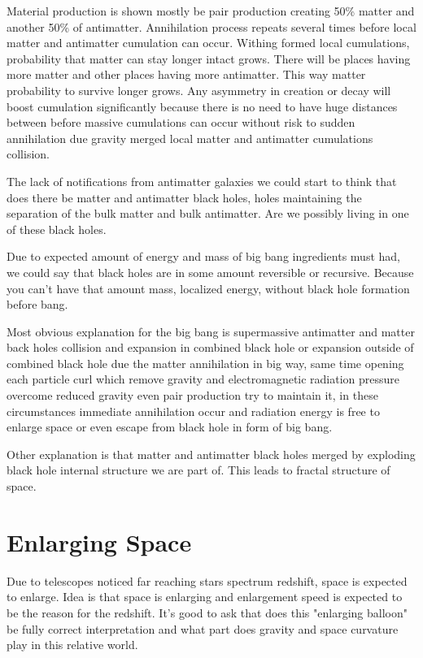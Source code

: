 Material production is shown mostly be pair production creating 50\% matter
and another 50\% of antimatter. Annihilation process repeats several times
before local matter and antimatter cumulation can occur. Withing formed local
cumulations, probability that matter can stay longer intact grows. There will
be places having more matter and other places having more antimatter. This way
matter probability to survive longer grows. Any asymmetry in creation or decay
will boost cumulation significantly because there is no need to have huge
distances between before massive cumulations can occur without risk to sudden
annihilation due gravity merged local matter and antimatter cumulations
collision.

The lack of notifications from antimatter galaxies we could start to think
that does there be matter and antimatter black holes, holes maintaining the
separation of the bulk matter and bulk antimatter. Are we possibly living
in one of these black holes.

Due to expected amount of energy and mass of big bang ingredients must had,
we could say that black holes are in some amount reversible or recursive.
Because you can't have that amount mass, localized energy, without black hole
formation before bang.

Most obvious explanation for the big bang is supermassive antimatter and
matter back holes collision and expansion in combined black hole or expansion
outside of combined black hole due the matter annihilation in big way, same
time opening each particle curl which remove gravity and electromagnetic
radiation pressure overcome reduced gravity even pair production try to
maintain it, in these circumstances immediate annihilation occur and radiation
energy is free to enlarge space or even escape from black hole in form of big
bang.

Other explanation is that matter and antimatter black holes merged by
exploding black hole internal structure we are part of. This leads to
fractal structure of space.


\section{Enlarging Space}
\label{enlargind_space}

Due to telescopes noticed far reaching stars spectrum redshift, space is
expected to enlarge. Idea is that space is enlarging and enlargement speed
is expected to be the reason for the redshift. It's good to ask that does
this "enlarging balloon" be fully correct interpretation and what part does
gravity and space curvature play in this relative world. 

